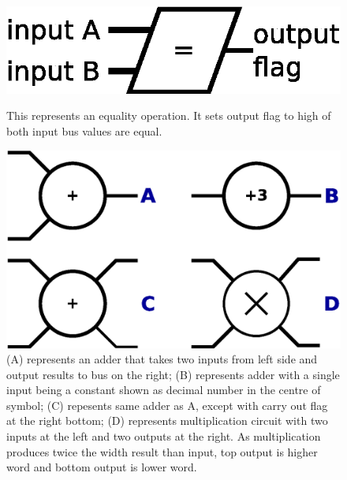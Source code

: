 \begin{figure}[bh]
	\vspace{1cm}
	\includegraphics[scale=0.4]{../resources/symbols/eq.eps}
	\caption{This represents an equality operation. It sets output flag to high of both input bus values are equal.}
	\vspace{1cm}
	\includegraphics[scale=0.4]{../resources/symbols/ops.eps}
	\caption{(A) represents an adder that takes two inputs from left side and output results to bus on the right; (B) represents adder with a single input being a constant shown as decimal number in the centre of symbol; (C) repesents same adder as A, except with carry out flag at the right bottom; (D) represents multiplication circuit with two inputs at the left and two outputs at the right. As multiplication produces twice the width result than input, top output is higher word and bottom output is lower word.}
\end{figure}



